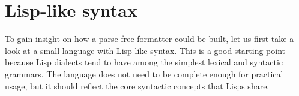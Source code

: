 \chapter{Lisp-like syntax}
To gain insight on how a parse-free formatter could be built,
let us first take a look at a small language with Lisp-like syntax.
This is a good starting point because Lisp dialects tend to
have among the simplest lexical and syntactic grammars.
The language does not need to be complete enough for practical usage,
but it should reflect the core syntactic concepts that Lisps share.









